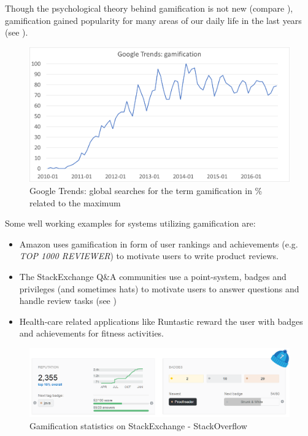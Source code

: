 Though the psychological theory behind gamification is not new (compare \autocite{White1959}), gamification gained popularity for many areas of our daily life in the last years (see ).

\begin{figure}[tbp] %
	\caption[Google Trends: gamification]{Google Trends: global searches for the term gamification in \% related to the maximum} \label{figure:Google trends gamification}
	\includegraphics[scale=1.0]{figures/google_trends_gamification.png}
\end{figure}

Some well working examples for systems utilizing gamification are:
\begin{itemize}
	\item Amazon uses gamification in form of user rankings and achievements (e.g. \textit{TOP 1000 REVIEWER}) to motivate users to write product reviews.
	\item The StackExchange Q\&A communities use a point-system, badges and privileges (and sometimes hats) to motivate users to answer questions and handle review tasks (see )
	\item Health-care related applications like Runtastic reward the user with badges and achievements for fitness activities.
\end{itemize}

\begin{figure}[!htb] %
	\caption[StackExchange - StackOverflow]{Gamification statistics on StackExchange - StackOverflow} \label{figure:StackOverflow}
	\includegraphics[scale=1.0]{figures/stackoverflow.png}
\end{figure}

